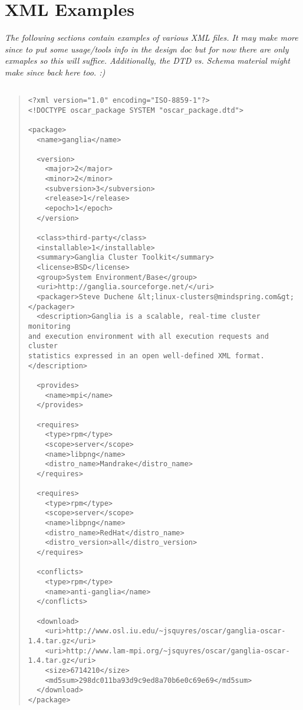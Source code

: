 %
%
%

\section{XML Examples}
\label{append:xml-overview}
\emph{The following sections contain examples of various XML files.  
It may make more since to put some usage/tools info in the design doc 
but for now there are only exmaples so this will suffice.
Additionally, the DTD vs. Schema material might make since back here
too.  :)}

\subsection{}
\begin{quote}
 \begin{small}
 \begin{verbatim}
<?xml version="1.0" encoding="ISO-8859-1"?>
<!DOCTYPE oscar_package SYSTEM "oscar_package.dtd">

<package>
  <name>ganglia</name>

  <version>
    <major>2</major>
    <minor>2</minor>
    <subversion>3</subversion>
    <release>1</release>
    <epoch>1</epoch>
  </version>

  <class>third-party</class>
  <installable>1</installable>
  <summary>Ganglia Cluster Toolkit</summary>
  <license>BSD</license>
  <group>System Environment/Base</group>
  <uri>http://ganglia.sourceforge.net/</uri>
  <packager>Steve Duchene &lt;linux-clusters@mindspring.com&gt;</packager>
  <description>Ganglia is a scalable, real-time cluster monitoring
and execution environment with all execution requests and cluster
statistics expressed in an open well-defined XML format.</description>

  <provides>
    <name>mpi</name>
  </provides>

  <requires>
    <type>rpm</type>
    <scope>server</scope>
    <name>libpng</name>
    <distro_name>Mandrake</distro_name>
  </requires>

  <requires>
    <type>rpm</type>
    <scope>server</scope>
    <name>libpng</name>
    <distro_name>RedHat</distro_name>
    <distro_version>all</distro_version>
  </requires>

  <conflicts>
    <type>rpm</type>
    <name>anti-ganglia</name>
  </conflicts>

  <download>
    <uri>http://www.osl.iu.edu/~jsquyres/oscar/ganglia-oscar-1.4.tar.gz</uri>
    <uri>http://www.lam-mpi.org/~jsquyres/oscar/ganglia-oscar-1.4.tar.gz</uri>
    <size>6714210</size>
    <md5sum>298dc011ba93d9c9ed8a70b6e0c69e69</md5sum>
  </download>
</package>
 \end{verbatim}
 \end{small}
\end{quote}

